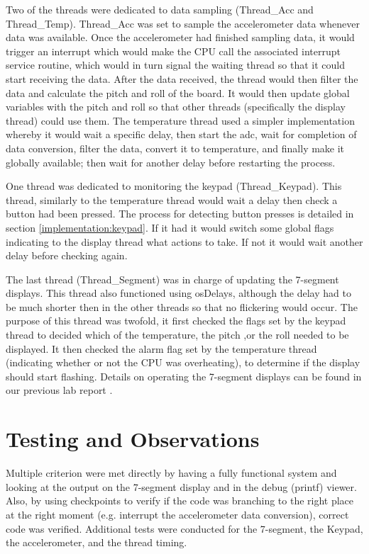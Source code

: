\documentclass[12pt]{article}
\begin{document}
Two of the threads were dedicated to data sampling (Thread\_Acc and Thread\_Temp). Thread\_Acc was set to sample the accelerometer data whenever data was available. Once the accelerometer had finished sampling data, it would trigger an interrupt which would make the CPU call the associated interrupt service routine, which would in turn signal the waiting thread so that it could start receiving the data. After the data received, the thread would then filter the data and calculate the pitch and roll of the board. It would then update global variables with the pitch and roll so that other threads (specifically the display thread) could use them. The temperature thread used a simpler implementation whereby it would wait a specific delay, then start the adc, wait for completion of data conversion, filter the data, convert it to temperature, and finally make it globally available; then wait for another delay before restarting the process.

One thread was dedicated to monitoring the keypad (Thread\_Keypad). This thread, similarly to the temperature thread would wait a delay then check a button had been pressed. The process for detecting button presses is detailed in section \ref{implementation:keypad}. If it had it would switch some global flags indicating to the display thread what actions to take. If not it would wait another delay before checking again.

The last thread (Thread\_Segment) was in charge of updating the 7-segment displays. This thread also functioned using osDelays, although the delay had to be much shorter then in the other threads so that no flickering would occur. The purpose of this thread was twofold, it first checked the flags set by the keypad thread to decided which of the temperature, the pitch ,or the roll needed to be displayed. It then checked the alarm flag set by the temperature thread (indicating whether or not the CPU was overheating), to determine if the display should start flashing. Details on operating the 7-segment displays can be found in our previous lab report \cite{Lab2report}.

\section{Testing and Observations}
Multiple criterion were met directly by having a fully functional system and looking at the output on the 7-segment display and in the debug (printf) viewer. Also, by using checkpoints to verify if the code was branching to the right place at the right moment (e.g. interrupt the accelerometer data conversion), correct code was verified. Additional tests were conducted for the 7-segment, the Keypad, the accelerometer, and the thread timing.
\end{document}

